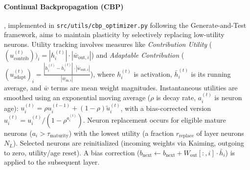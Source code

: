 \documentclass{article}
\numberwithin{figure}{section}
\begin{document}
\paragraph{Continual Backpropagation (CBP)}, implemented in \texttt{src/utils/cbp\_optimizer.py} following the Generate-and-Test framework, aims to maintain plasticity by selectively replacing low-utility neurons. Utility tracking involves measures like \emph{Contribution Utility} ($(u_{\text{contrib}}^{(t)}))_i = |h_i^{(t)}| \cdot |\bar{w}_{\text{out},i}|$) and \emph{Adaptable Contribution} ($(u_{\text{adapt}}^{(t)})_i = \frac{|h_i^{(t)} - \bar{h}_i^{(t)}| \cdot |\bar{w}_{\text{out},i}|}{|\bar{w}_{\text{in},i}|}$), where $h_i^{(t)}$ is activation, $\bar{h}_i^{(t)}$ is its running average, and $\bar{w}$ terms are mean weight magnitudes. Instantaneous utilities are smoothed using an exponential moving average ($\rho$ is decay rate, $a_i^{(t)}$ is neuron age): $u_i^{(t)} = \rho u_i^{(t-1)} + (1-\rho) \tilde{u}_i^{(t)}$, with a bias-corrected version $\hat{u}_i^{(t)} = u_i^{(t)}/(1 - \rho^{a_i^{(t)}})$. Neuron replacement occurs for eligible mature neurons ($a_i > \tau_{\text{maturity}}$) with the lowest utility (a fraction $r_{\text{replace}}$ of layer neurons $N_L$). Selected neurons are reinitialized (incoming weights via Kaiming, outgoing to zero, utility/age reset). A bias correction ($b_{\text{next}} \leftarrow b_{\text{next}} + W_{\text{out}}[:, i] \cdot \bar{h}_i$) is applied to the subsequent layer.
\end{document}
